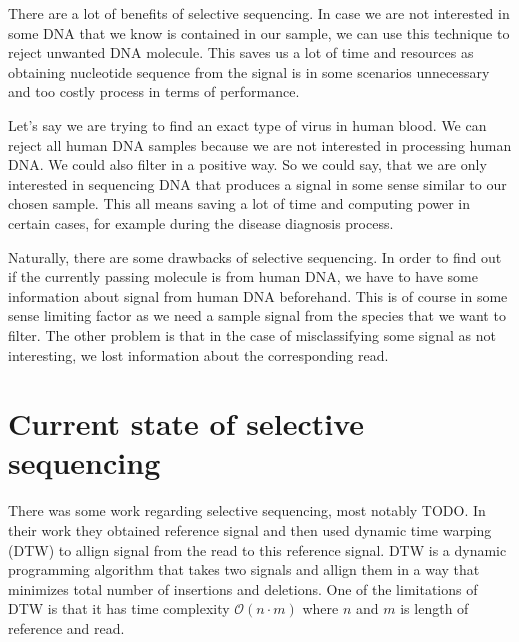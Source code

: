 There are a lot of benefits of selective sequencing. In case we are not interested
in some DNA that we know is contained in our sample, we can use this technique to
reject unwanted DNA molecule. This saves us a lot of time and resources as obtaining
nucleotide sequence from the signal is in some scenarios unnecessary and too
costly process in terms of performance.

Let's say we are trying to find an exact type of virus in human blood. We can
reject all human DNA samples because we are not interested in processing human
DNA. We could also filter in a positive way. So we could say, that we are only
interested in sequencing DNA that produces a signal in some sense similar to our
chosen sample. This all means saving a lot of time and computing power in certain
cases, for example during the disease diagnosis process.

Naturally, there are some drawbacks of selective sequencing. In order to find out
if the currently passing molecule is from human DNA, we have to have some information
about signal from human DNA beforehand.
This is of course in some sense limiting factor as we need a sample signal from
the species that we want to filter. The other problem is that in the case of misclassifying
some signal as not interesting, we lost information about the corresponding
read.

\section{Current state of selective sequencing}


There was some work regarding selective sequencing, most notably TODO. In their
work they obtained reference signal and then used dynamic time warping (DTW) to
allign signal from the read to this reference signal. DTW is a dynamic programming
algorithm that takes two signals and allign them in a way that minimizes total
number of insertions and deletions. One of the limitations of DTW is that it has
time complexity $\mathcal{O}(n\cdot m)$ where $n$ and $m$ is length of reference and read.
